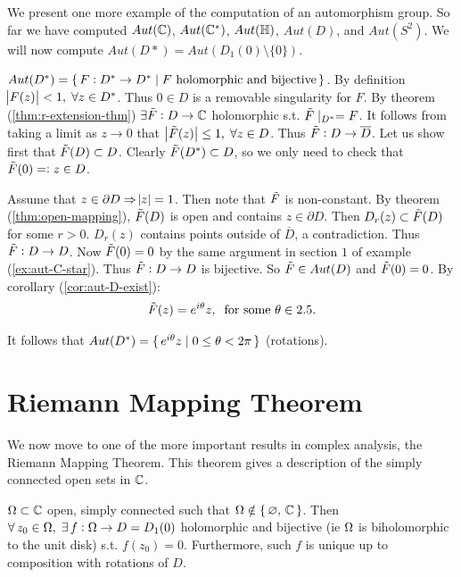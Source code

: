 We present one more example of the computation of an automorphism group. So far we have computed $Aut(\mathbb{C})$, $Aut(\mathbb{C}^*)$, $Aut(\mathbb{H})$, $Aut(D)$, and $Aut(S^2)$. We will now compute $Aut(D*) = Aut(D_1 ( 0) \setminus \{ 0 \} )$.

\begin{example}[$Aut(D^*)$]

$Aut(D^*) = \set{ F : D^* \to D^* \mid F \text{ holomorphic and bijective}}$. By definition $\abs{F(z)} < 1, \; \forall z \in D^*$. Thus $0 \in D$ is a removable singularity for $F$. By theorem (\ref{thm:r-extension-thm}) $\exists \Tilde{F} : D \to \mathbb{C}$ holomorphic s.t. $\Tilde{F} \mid_{D^*} = F$. It follows from taking a limit as $z \to 0$ that $ \big| \Tilde{F} (z)\big| \leq 1, \; \forall z \in D$. Thus $\Tilde{F} : D \to \overline{D}$. Let us show first that $\Tilde{F} (D) \subset D$. Clearly $\Tilde{F} ( D^*) \subset D$, so we only need to check that $\Tilde{F} (0) = \vcentcolon z \in D$.

Assume that $z \in \partial D \Rightarrow \abs{z} = 1$. Then note that $\Tilde{F}$ is non-constant. By theorem (\ref{thm:open-mapping}), $\Tilde{F} (D)$ is open and contains $z \in \partial D$. Then $D_r(z) \subset \Tilde{F} (D)$ for some $r>0$. $D_r(z) $ contains points outside of $\overline{D}$, a contradiction. Thus $\Tilde{F}:D \to D$.
Now $\Tilde{F}(0)=0$ by the same argument in section $1$ of example (\ref{ex:aut-C-star}). Thus $\Tilde{F} : D \to D$ is bijective.
So $\Tilde{F} \in Aut(D)$ and $\Tilde{F}(0) = 0$. By corollary (\ref{cor:aut-D-exist}):
\begin{align*}
    \Tilde{F} (z) = e^{i \theta} z, \: \text{ for some $\theta \in 2.5$}.
\end{align*}


It follows that $Aut(D^*) = \set{ e^{i \theta} z \mid 0 \leq \theta < 2 \pi}$ (rotations).

\end{example}

\section{Riemann Mapping Theorem}

We now move to one of the more important results in complex analysis, the Riemann Mapping Theorem. This theorem gives a description of the simply connected open sets in $\mathbb{C}$.

\begin{theorem}\label{thm:r-map-thm}
 $\Omega \subset \mathbb{C}$ open, simply connected such that $\Omega \notin \set{\varnothing, \, \mathbb{C}}$. Then $\forall \, z_0 \in \Omega, \; \exists \, f : \Omega \to D = D_1(0)$ holomorphic and bijective (ie $\Omega$ is biholomorphic to the unit disk) s.t. $f(z_0) = 0$. Furthermore, such $f$ is unique up to composition with rotations of $D$.
\end{theorem}

